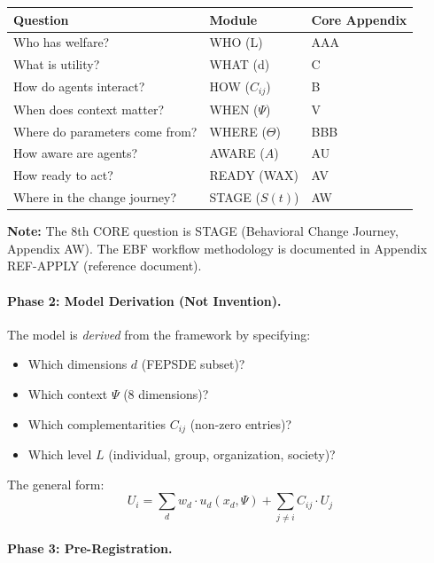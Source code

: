 \begin{center}
\small
\begin{tabular}{@{}lll@{}}
\toprule
\textbf{Question} & \textbf{Module} & \textbf{Core Appendix} \\
\midrule
Who has welfare? & WHO (L) & AAA \\
What is utility? & WHAT (d) & C \\
How do agents interact? & HOW ($C_{ij}$) & B \\
When does context matter? & WHEN ($\Psi$) & V \\
Where do parameters come from? & WHERE ($\Theta$) & BBB \\
How aware are agents? & AWARE ($A$) & AU \\
How ready to act? & READY (WAX) & AV \\
Where in the change journey? & STAGE ($S(t)$) & AW \\
\bottomrule
\end{tabular}
\end{center}

\textbf{Note:} The 8th CORE question is STAGE (Behavioral Change Journey, Appendix AW).
The EBF workflow methodology is documented in Appendix REF-APPLY (reference document).

\paragraph{Phase 2: Model Derivation (Not Invention).}

The model is \textit{derived} from the framework by specifying:
\begin{itemize}[nosep]
    \item Which dimensions $d$ (FEPSDE subset)?
    \item Which context $\Psi$ (8 dimensions)?
    \item Which complementarities $C_{ij}$ (non-zero entries)?
    \item Which level $L$ (individual, group, organization, society)?
\end{itemize}

The general form:
\begin{equation}
U_i = \sum_d w_d \cdot u_d(x_d, \Psi) + \sum_{j \neq i} C_{ij} \cdot U_j
\end{equation}

\paragraph{Phase 3: Pre-Registration.}

